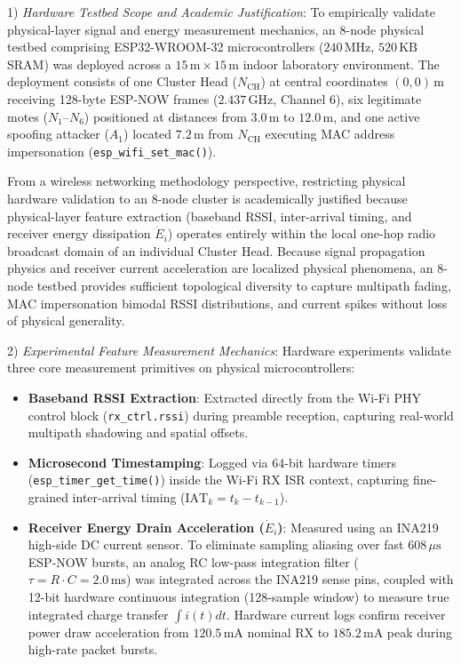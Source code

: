 \documentclass[conference]{IEEEtran}
\begin{document}
1) \textit{Hardware Testbed Scope and Academic Justification}: To empirically validate physical-layer signal and energy measurement mechanics, an 8-node physical testbed comprising ESP32-WROOM-32 microcontrollers ($240\,\text{MHz}$, $520\,\text{KB}$ SRAM) was deployed across a $15\,\text{m} \times 15\,\text{m}$ indoor laboratory environment. The deployment consists of one Cluster Head ($N_\text{CH}$) at central coordinates $(0,0)\,\text{m}$ receiving 128-byte ESP-NOW frames ($2.437\,\text{GHz}$, Channel 6), six legitimate motes ($N_1\text{--}N_6$) positioned at distances from $3.0\,\text{m}$ to $12.0\,\text{m}$, and one active spoofing attacker ($A_1$) located $7.2\,\text{m}$ from $N_\text{CH}$ executing MAC address impersonation (\texttt{esp\_wifi\_set\_mac()}).

From a wireless networking methodology perspective, restricting physical hardware validation to an 8-node cluster is academically justified because physical-layer feature extraction (baseband RSSI, inter-arrival timing, and receiver energy dissipation $\dot{E}_i$) operates entirely within the local one-hop radio broadcast domain of an individual Cluster Head. Because signal propagation physics and receiver current acceleration are localized physical phenomena, an 8-node testbed provides sufficient topological diversity to capture multipath fading, MAC impersonation bimodal RSSI distributions, and current spikes without loss of physical generality.

2) \textit{Experimental Feature Measurement Mechanics}: Hardware experiments validate three core measurement primitives on physical microcontrollers:
\begin{itemize}
    \item \textbf{Baseband RSSI Extraction}: Extracted directly from the Wi-Fi PHY control block (\texttt{rx\_ctrl.rssi}) during preamble reception, capturing real-world multipath shadowing and spatial offsets.
    \item \textbf{Microsecond Timestamping}: Logged via 64-bit hardware timers (\texttt{esp\_timer\_get\_time()}) inside the Wi-Fi RX ISR context, capturing fine-grained inter-arrival timing ($\text{IAT}_k = t_k - t_{k-1}$).
    \item \textbf{Receiver Energy Drain Acceleration ($\dot{E}_i$)}: Measured using an INA219 high-side DC current sensor. To eliminate sampling aliasing over fast $608\,\mu\text{s}$ ESP-NOW bursts, an analog RC low-pass integration filter ($\tau = R \cdot C = 2.0\,\text{ms}$) was integrated across the INA219 sense pins, coupled with 12-bit hardware continuous integration (128-sample window) to measure true integrated charge transfer $\int i(t) dt$. Hardware current logs confirm receiver power draw acceleration from $120.5\,\text{mA}$ nominal RX to $185.2\,\text{mA}$ peak during high-rate packet bursts.
\end{itemize}
\end{document}
